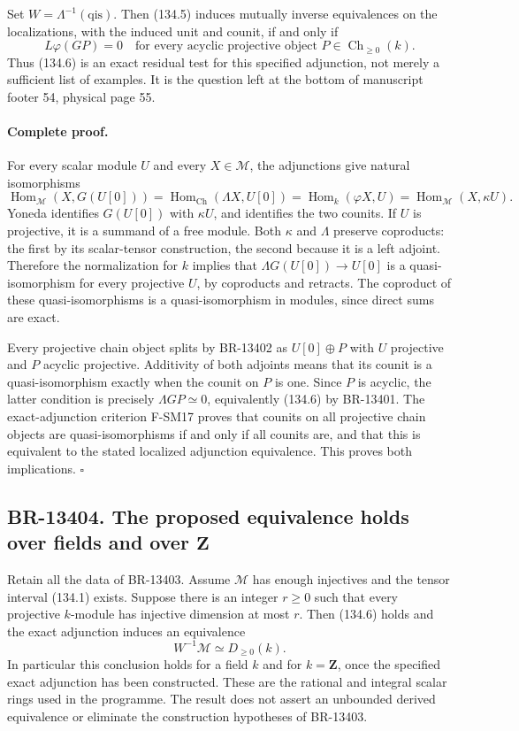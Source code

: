 Set \(W=\Lambda^{-1}(\mathrm{qis})\).  Then (134.5) induces
mutually inverse equivalences on the localizations, with the induced
unit and counit, if and only if
\[
 L\varphi(GP)=0
 \quad\text{for every acyclic projective object }
 P\in\operatorname{Ch}_{\geq0}(k).
 \tag{134.6}
\]
Thus (134.6) is an exact residual test for this specified adjunction,
not merely a sufficient list of examples.  It is the question left at
the bottom of manuscript footer 54, physical page 55.

\paragraph{Complete proof.}
For every scalar module \(U\) and every \(X\in\mathcal M\),
the adjunctions give natural isomorphisms
\[
 \operatorname{Hom}_{\mathcal M}(X,G(U[0]))
 =\operatorname{Hom}_{\mathrm{Ch}}(\Lambda X,U[0])
 =\operatorname{Hom}_k(\varphi X,U)
 =\operatorname{Hom}_{\mathcal M}(X,\kappa U).
\]
Yoneda identifies \(G(U[0])\) with \(\kappa U\), and identifies
the two counits.  If \(U\) is projective, it is a summand of a free
module.  Both \(\kappa\) and \(\Lambda\) preserve coproducts:
the first by its scalar-tensor construction, the second because it is
a left adjoint.  Therefore the normalization for \(k\) implies that
\(\Lambda G(U[0])\to U[0]\) is a quasi-isomorphism for every
projective \(U\), by coproducts and retracts.  The coproduct of these
quasi-isomorphisms is a quasi-isomorphism in modules, since direct
sums are exact.

Every projective chain object splits by BR-13402 as \(U[0]\oplus P\)
with \(U\) projective and \(P\) acyclic projective.  Additivity of
both adjoints means that its counit is a quasi-isomorphism exactly when
the counit on \(P\) is one.  Since \(P\) is acyclic, the latter
condition is precisely \(\Lambda GP\simeq0\), equivalently (134.6)
by BR-13401.  The exact-adjunction criterion F-SM17 proves that counits
on all projective chain objects are quasi-isomorphisms if and only if
all counits are, and that this is equivalent to the stated localized
adjunction equivalence.  This proves both implications. \(\square\)

\subsection{BR-13404. The proposed equivalence holds over fields and over \(\mathbf Z\)}
Retain all the data of BR-13403.  Assume \(\mathcal M\) has enough
injectives and the tensor interval (134.1) exists.  Suppose there is
an integer \(r\geq0\) such that every projective \(k\)-module has
injective dimension at most \(r\).  Then (134.6) holds and the exact
adjunction induces an equivalence
\[
 W^{-1}\mathcal M\simeq D_{\geq0}(k).
 \tag{134.7}
\]
In particular this conclusion holds for a field \(k\) and for
\(k=\mathbf Z\), once the specified exact adjunction has been
constructed.  These are the rational and integral scalar rings used
in the programme.  The result does not assert an unbounded derived
equivalence or eliminate the construction hypotheses of BR-13403.

